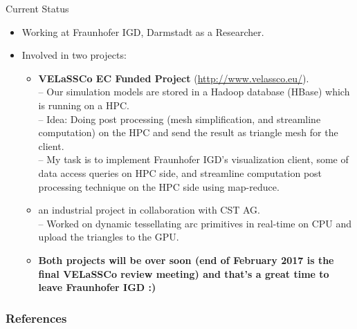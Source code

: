 \documentclass{beamer}
\begin{document}
\begin{frame}{Current Status}
	\begin{itemize}
		\item Working at Fraunhofer IGD, Darmstadt as a Researcher.
		\item Involved in two projects:
			\begin{itemize}
				\item \textbf{VELaSSCo EC Funded Project} (\url{http://www.velassco.eu/}).\\
				
				-- Our simulation models are stored in a Hadoop database (HBase) which is running on a HPC.\\
				-- Idea: Doing post processing (mesh simplification, and streamline computation) on the HPC and send the result as triangle mesh for the client.\\
				-- My task is to implement Fraunhofer IGD's visualization client, some of data access queries on HPC side, and streamline computation post processing technique on the HPC side using map-reduce.
				\item an industrial project in collaboration with CST AG.\\
				-- Worked on dynamic tessellating arc primitives in real-time on CPU and upload the triangles to the GPU.
				\item \textbf{Both projects will be over soon (end of February 2017 is the final VELaSSCo review meeting) and that's a great time to leave Fraunhofer IGD :)}
			\end{itemize}		
	\end{itemize}
\end{frame}

\begin{frame}[allowframebreaks]
	\frametitle{References}
%	
	
	
\end{frame}
\end{document}
